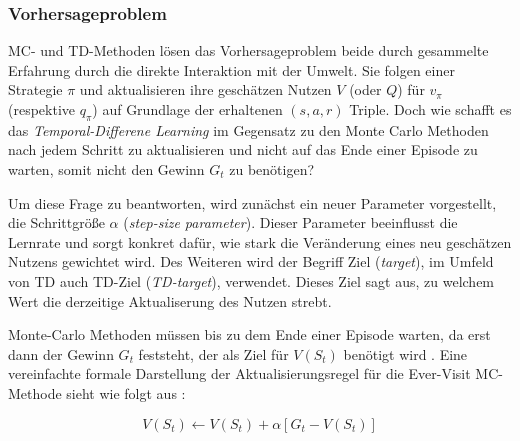 \subsubsection{Vorhersageproblem}
MC- und TD-Methoden lösen das Vorhersageproblem beide durch gesammelte Erfahrung durch die direkte Interaktion mit der Umwelt. Sie folgen einer Strategie $\pi$ und aktualisieren ihre geschätzen Nutzen $V$ (oder $Q$) für $v_\pi$ (respektive $q_\pi$) auf Grundlage der erhaltenen $(s,a,r)$ Triple. Doch wie schafft es das \textit{Temporal-Differene Learning} im Gegensatz zu den Monte Carlo Methoden nach jedem Schritt zu aktualisieren und nicht auf das Ende einer Episode zu warten, somit nicht den Gewinn $G_t$ zu benötigen?
\par 
Um diese Frage zu beantworten, wird zunächst ein neuer Parameter vorgestellt, die Schrittgröße $\alpha$ (\textit{step-size parameter}). Dieser Parameter beeinflusst die Lernrate und sorgt konkret dafür, wie stark die Veränderung eines neu geschätzen Nutzens gewichtet wird. Des Weiteren wird der Begriff \glqq Ziel\grqq{} (\textit{target}), im Umfeld von TD auch TD-Ziel (\textit{TD-target}), verwendet. Dieses Ziel sagt aus, zu welchem Wert die derzeitige Aktualiserung des Nutzen strebt.
\par 
Monte-Carlo Methoden müssen bis zu dem Ende einer Episode warten, da erst dann der Gewinn $G_t$ feststeht, der als Ziel für $V(S_t)$ benötigt wird \cite[S.~119]{Sutton1998}. Eine vereinfachte formale Darstellung der Aktualisierungsregel für die Ever-Visit MC-Methode sieht wie folgt aus \cite[S.~119]{Sutton1998}:

\begin{equation}
    V(S_t) \leftarrow V(S_t) + \alpha \left[G_t - V(S_t)\right]
\end{equation}

